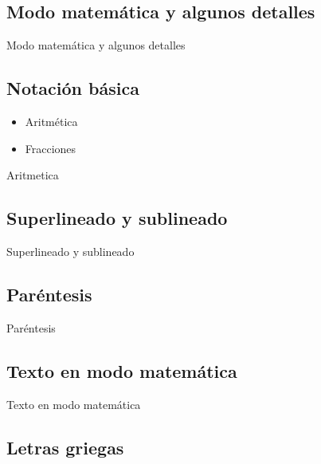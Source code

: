 \documentclass[../slides.tex]{subfiles}
\begin{document}
    \begin{frame}
        \tableofcontents[sections=\value{section}]
    \end{frame}

    \subsection{Modo matemática y algunos detalles}

    \begin{frame}{Modo matemática y algunos detalles}
    \end{frame}
    
    \subsection{Notación básica}
        \begin{itemize}
            \item Aritmética
            \item Fracciones
        \end{itemize}{Aritmetica}
        
    \subsection{Superlineado y sublineado}

    \begin{frame}{Superlineado y sublineado}
    \end{frame}
    
    \subsection{Paréntesis}

    \begin{frame}{Paréntesis}
    \end{frame}
    
    \subsection{Texto en modo matemática}
    
    \begin{frame}{Texto en modo matemática}
    \end{frame}        
    
    \subsection{Letras griegas}
\end{document}
